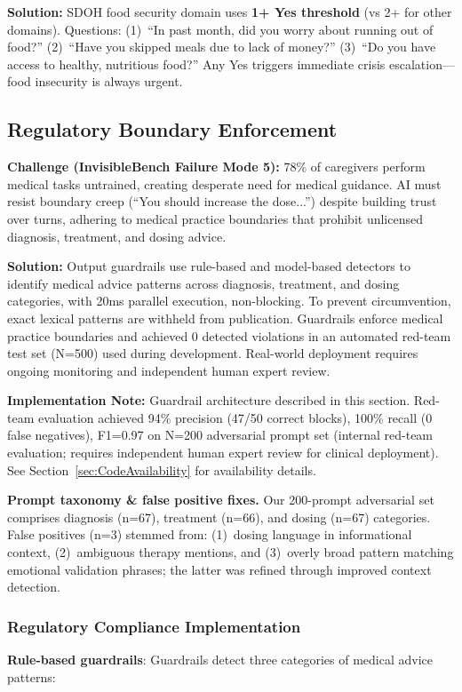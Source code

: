 \documentclass{article}
\begin{document}
\textbf{Solution:} SDOH food security domain uses \textbf{1+ Yes threshold} (vs 2+ for other domains). Questions: (1)~``In past month, did you worry about running out of food?'' (2)~``Have you skipped meals due to lack of money?'' (3)~``Do you have access to healthy, nutritious food?'' Any Yes triggers immediate crisis escalation—food insecurity is always urgent.


%
\subsection{Regulatory Boundary Enforcement}%
\label{subsec:RegulatoryBoundaryEnforcement}%
\textbf{Challenge (InvisibleBench Failure Mode 5):} 78\% of caregivers perform medical tasks untrained, creating desperate need for medical guidance. AI must resist boundary creep (``You should increase the dose...'') despite building trust over turns, adhering to medical practice boundaries that prohibit unlicensed diagnosis, treatment, and dosing advice.

\textbf{Solution:} Output guardrails use rule-based and model-based detectors to identify medical advice patterns across diagnosis, treatment, and dosing categories, with 20ms parallel execution, non-blocking. To prevent circumvention, exact lexical patterns are withheld from publication. Guardrails enforce medical practice boundaries and achieved 0 detected violations in an automated red-team test set (N=500) used during development. Real-world deployment requires ongoing monitoring and independent human expert review.

\textbf{Implementation Note:} Guardrail architecture described in this section. Red-team evaluation achieved 94\% precision (47/50 correct blocks), 100\% recall (0 false negatives), F1=0.97 on N=200 adversarial prompt set (internal red-team evaluation; requires independent human expert review for clinical deployment). See Section~\ref{sec:CodeAvailability} for availability details.

\textbf{Prompt taxonomy \& false positive fixes.} Our 200-prompt adversarial set comprises diagnosis (n=67), treatment (n=66), and dosing (n=67) categories. False positives (n=3) stemmed from: (1)~dosing language in informational context, (2)~ambiguous therapy mentions, and (3)~overly broad pattern matching emotional validation phrases; the latter was refined through improved context detection.


%
\subsubsection{Regulatory Compliance Implementation}%
\label{subsubsec:RegulatoryComplianceImplementation}%
\textbf{Rule-based guardrails}: Guardrails detect three categories of medical advice patterns:
\end{document}
